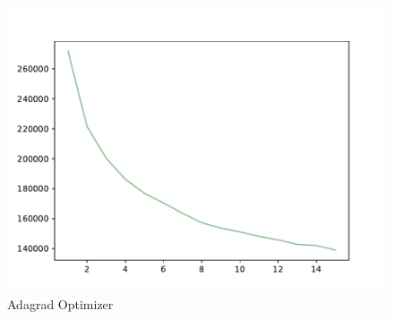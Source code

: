 \documentclass{article}
\begin{document}
\begin{figure}[!h]
{\begin{minipage}{0.21\linewidth}
  \includegraphics[scale=0.23]{imgs/test_loss_ada.pdf}
  \end{minipage}
}
\quad
{}
\caption{ Adagrad Optimizer}
\label{ada}
\end{figure}
\end{document}

